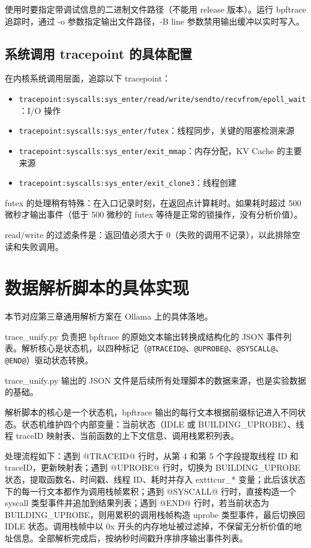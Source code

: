 使用时要指定带调试信息的二进制文件路径（不能用 release 版本）。运行 bpftrace 追踪时，通过 -o 参数指定输出文件路径，-B line 参数禁用输出缓冲以实时写入。

\subsection{系统调用 tracepoint 的具体配置}

在内核系统调用层面，追踪以下 tracepoint：

\begin{itemize}
    \item \texttt{tracepoint:syscalls:sys\_enter/read/write/sendto/recvfrom/epoll\_wait}：I/O 操作
    \item \texttt{tracepoint:syscalls:sys\_enter/futex}：线程同步，关键的阻塞检测来源
    \item \texttt{tracepoint:syscalls:sys\_enter/exit\_mmap}：内存分配，KV Cache 的主要来源
    \item \texttt{tracepoint:syscalls:sys\_enter/exit\_clone3}：线程创建
\end{itemize}

futex 的处理稍有特殊：在入口记录时刻，在返回点计算耗时。如果耗时超过 500 微秒才输出事件（低于 500 微秒的 futex 等待是正常的锁操作，没有分析价值）。

read/write 的过滤条件是：返回值必须大于 0（失败的调用不记录），以此排除空读和失败调用。

\section{数据解析脚本的具体实现}

本节对应第三章通用解析方案在 Ollama 上的具体落地。

trace\_unify.py 负责把 bpftrace 的原始文本输出转换成结构化的 JSON 事件列表。解析核心是状态机，以四种标记（\texttt{@TRACEID@}、\texttt{@UPROBE@}、\texttt{@SYSCALL@}、\texttt{@END@}）驱动状态转换。

trace\_unify.py 输出的 JSON 文件是后续所有处理脚本的数据来源，也是实验数据的基础。

解析脚本的核心是一个状态机，bpftrace 输出的每行文本根据前缀标记进入不同状态。状态机维护四个内部变量：当前状态（IDLE 或 BUILDING\_UPROBE）、线程 traceID 映射表、当前函数的上下文信息、调用栈累积列表。

处理流程如下：遇到 @TRACEID@ 行时，从第 4 和第 5 个字段提取线程 ID 和 traceID，更新映射表；遇到 @UPROBE@ 行时，切换为 BUILDING\_UPROBE 状态，提取函数名、时间戳、线程 ID、耗时并存入 	exttt{cur\_*} 变量；此后该状态下的每一行文本都作为调用栈帧累积；遇到 @SYSCALL@ 行时，直接构造一个 syscall 类型事件并追加到结果列表；遇到 @END@ 行时，若当前状态为 BUILDING\_UPROBE，则用累积的调用栈帧构造 uprobe 类型事件，最后切换回 IDLE 状态。调用栈帧中以 0x 开头的内存地址被过滤掉，不保留无分析价值的地址信息。全部解析完成后，按纳秒时间戳升序排序输出事件列表。


